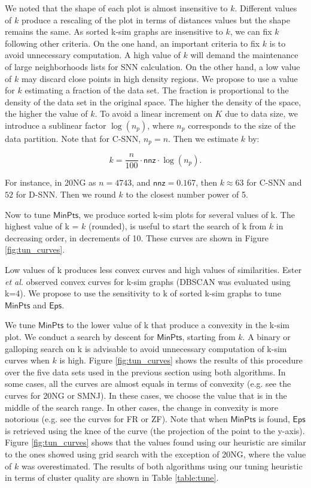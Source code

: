 \documentclass[smallextended]{svjour3}       %
\begin{document}
We noted that the shape of each plot is almost insensitive to $k$. Different values of $k$ produce a rescaling of the plot in terms of distances values but the shape remains the same.  
As sorted k-sim graphs are insensitive to $k$, we can fix $k$ following other criteria. On the one hand, an important criteria to fix $k$ is to avoid unnecessary computation. A high value of $k$ will demand the maintenance of large neighborhoods lists for SNN calculation. On the other hand, a low value of $k$ may discard close points in high density regions. We propose to use a value for $k$ estimating a fraction of the data set. The fraction is proportional to the density of the data set in the original space. The higher the density of the space, the higher the value of $k$. To avoid a linear increment on $K$ due to data size, we introduce a sublinear factor $\log(n_p)$, where $n_p$ corresponds to the size of the data partition. Note that for C-SNN, $n_p = n$. Then we estimate $k$ by:

\[ k = \frac{n}{100} \cdot \textsf{nnz} \cdot \log(n_p) . \]

For instance, in 20NG as $n=4743$, and $\mathsf{nnz} = 0.167$, then $k \approx 63$ for C-SNN and $52$ for D-SNN. Then we round $k$ to the closest number power of 5. 

Now to tune $\mathsf{MinPts}$, we produce sorted k-sim plots for several values of k. 
The highest value of k = $k$ (rounded), is useful to start the search of k from $k$ in decreasing order, in decrements of 10. These curves are shown in Figure \ref{fig:tun_curves}.

Low values of k produces less convex curves and high values of similarities. 
Ester \textit{et al.} \cite{E96} observed convex curves for k-sim graphs (DBSCAN was evaluated using k=4). 
We propose to use the sensitivity to k of sorted k-sim graphs to tune $\mathsf{MinPts}$ and $\mathsf{Eps}$. 

We tune $\mathsf{MinPts}$ to the lower value of k that produce a convexity in the k-sim plot. We conduct a search by descent for $\mathsf{MinPts}$, starting from $k$. A binary or galloping search on k is advisable to avoid unnecessary computation of k-sim curves when $k$ is high. Figure \ref{fig:tun_curves} shows the results of this procedure over the five data sets used in the previous section using both algorithms. In some cases, all the curves are almost equals in terms of convexity (e.g. see the curves for 20NG or SMNJ). In these cases, we choose the value that is in the middle of the search range. In other cases, the change in convexity is more notorious (e.g. see the curves for FR or ZF). Note that when $\mathsf{MinPts}$ is found, $\mathsf{Eps}$ is retrieved using the knee of the curve (the projection of the point to the y-axis). Figure \ref{fig:tun_curves} shows that the values found using our heuristic are similar to the ones showed using grid search with the exception of 20NG, where the value of $k$ was overestimated. The results of both algorithms using our tuning heuristic in terms of cluster quality are shown in Table \ref{table:tune}.
\end{document}
